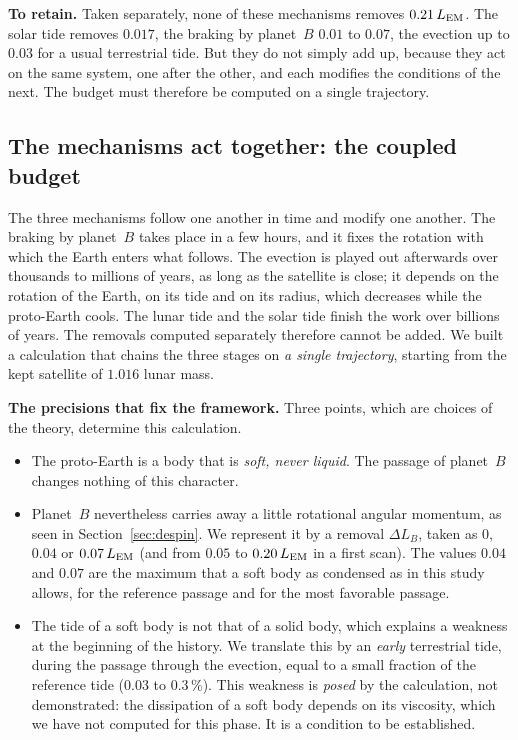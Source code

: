 \documentclass[11pt,a4paper]{article}
\newcommand{\LEM}{\ensuremath{L_{\rm EM}}}
\begin{document}
\textbf{To retain.} Taken separately, none of these mechanisms removes $0.21\,\LEM$. The solar tide removes $0.017$, the braking by planet~$B$ $0.01$ to $0.07$, the evection up to $0.03$ for a usual terrestrial tide. But they do not simply add up, because they act on the same system, one after the other, and each modifies the conditions of the next. The budget must therefore be computed on a single trajectory.

\subsection{The mechanisms act together: the coupled budget}
\label{sec:couple}

The three mechanisms follow one another in time and modify one another. The braking by planet~$B$ takes place in a few hours, and it fixes the rotation with which the Earth enters what follows. The evection is played out afterwards over thousands to millions of years, as long as the satellite is close; it depends on the rotation of the Earth, on its tide and on its radius, which decreases while the proto-Earth cools. The lunar tide and the solar tide finish the work over billions of years. The removals computed separately therefore cannot be added. We built a calculation that chains the three stages on \emph{a single trajectory}, starting from the kept satellite of $1.016$ lunar mass.

\textbf{The precisions that fix the framework.} Three points, which are choices of the theory, determine this calculation.
\begin{itemize}[leftmargin=1.6em,itemsep=2pt]
\item The proto-Earth is a body that is \emph{soft, never liquid}. The passage of planet~$B$ changes nothing of this character.
\item Planet~$B$ nevertheless carries away a little rotational angular momentum, as seen in Section~\ref{sec:despin}. We represent it by a removal $\Delta L_B$, taken as $0$, $0.04$ or $0.07\,\LEM$ (and from $0.05$ to $0.20\,\LEM$ in a first scan). The values $0.04$ and $0.07$ are the maximum that a soft body as condensed as in this study allows, for the reference passage and for the most favorable passage.
\item The tide of a soft body is not that of a solid body, which explains a weakness at the beginning of the history. We translate this by an \emph{early} terrestrial tide, during the passage through the evection, equal to a small fraction of the reference tide ($0.03$ to $0.3\,\%$). This weakness is \emph{posed} by the calculation, not demonstrated: the dissipation of a soft body depends on its viscosity, which we have not computed for this phase. It is a condition to be established.
\end{itemize}
\end{document}
